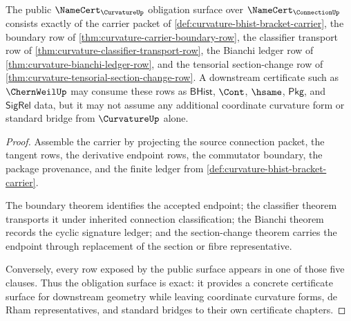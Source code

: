 \begin{theorem}
\label{thm:curvature-public-obligation-surface}
The public $\NameCert_{\CurvatureUp}$ obligation surface over $\NameCert_{\ConnectionUp}$ consists exactly of the carrier packet of \autoref{def:curvature-bhist-bracket-carrier}, the boundary row of \autoref{thm:curvature-carrier-boundary-row}, the classifier transport row of \autoref{thm:curvature-classifier-transport-row}, the Bianchi ledger row of \autoref{thm:curvature-bianchi-ledger-row}, and the tensorial section-change row of \autoref{thm:curvature-tensorial-section-change-row}. A downstream certificate such as $\ChernWeilUp$ may consume these rows as $\mathsf{BHist}$, $\Cont$, $\hsame$, $\mathsf{Pkg}$, and $\mathsf{SigRel}$ data, but it may not assume any additional coordinate curvature form or standard bridge from $\CurvatureUp$ alone.
\end{theorem}
\begin{proof}
Assemble the carrier by projecting the source connection packet, the tangent rows, the derivative endpoint rows, the commutator boundary, the package provenance, and the finite ledger from \autoref{def:curvature-bhist-bracket-carrier}.

The boundary theorem identifies the accepted endpoint; the classifier theorem transports it under inherited connection classification; the Bianchi theorem records the cyclic signature ledger; and the section-change theorem carries the endpoint through replacement of the section or fibre representative.

Conversely, every row exposed by the public surface appears in one of those five clauses. Thus the obligation surface is exact: it provides a concrete certificate surface for downstream geometry while leaving coordinate curvature forms, de Rham representatives, and standard bridges to their own certificate chapters.
\end{proof}

